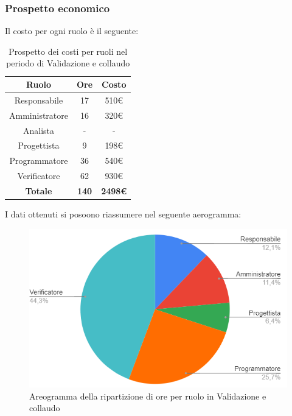 \subsubsection{Prospetto economico}
Il costo per ogni ruolo è il seguente:
\begin{table}[H]
		\begin{center}
			\setlength{\aboverulesep}{0pt}
			\setlength{\belowrulesep}{0pt}
			\setlength{\extrarowheight}{.75ex}
			\begin{tabular}{ c c c }
				\rowcolor{AzzurroGruppo!30} 
				\textbf{Ruolo} & \textbf{Ore} & \textbf{Costo}  \\
				\toprule
				Responsabile   & 17 & 510€ \\
				Amministratore & 16 & 320€ \\
				Analista       & -  & - \\
				Progettista    & 9  & 198€ \\
				Programmatore  & 36 & 540€ \\
				Verificatore   & 62 & 930€ \\
				\textbf{Totale} & \textbf{140} & \textbf{2498€} \\
				\bottomrule
			\end{tabular}
			\caption{ Prospetto dei costi per ruoli nel periodo di Validazione e collaudo}
		\end{center}
	\end{table}
I dati ottenuti si posoono riassumere nel seguente aerogramma:
\begin{figure}[H]
    \centering
    \includegraphics[scale = 0.5]{components/img/validazione_torta.png}
    \caption{ Areogramma della ripartizione di ore per ruolo in Validazione e collaudo}
    \label{fig:logo}
\end{figure}
